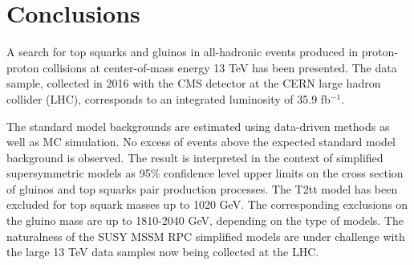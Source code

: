 \chapter{Conclusions}

A search for top squarks and gluinos in all-hadronic events produced in proton-proton collisions at center-of-mass energy 13 TeV has been presented. The data sample, collected in 2016 with the CMS detector at the CERN large hadron collider (LHC), corresponds to an integrated luminosity of 35.9 fb$^{-1}$.

The standard model backgrounds are estimated using data-driven methods as well as MC simulation. No excess of events above the expected standard model background is observed. The result is interpreted in the context of simplified supersymmetric models as 95\% confidence level upper limits on the cross section of gluinos and top squarks pair production processes. The T2tt model has been excluded for top squark masses up to 1020 GeV. The corresponding exclusions on the gluino mass are up to 1810-2040 GeV, depending on the type of models. The naturalness of the SUSY MSSM RPC simplified models are under challenge with the large 13 TeV data samples now being collected at the LHC.
